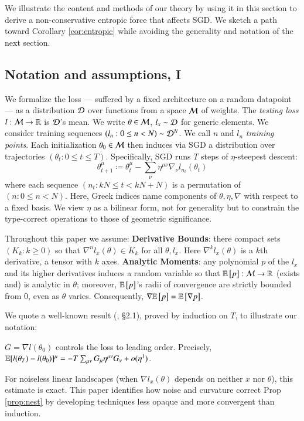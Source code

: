   We illustrate the content and methods of our theory by using it in this
  section to derive a non-conservative entropic force that affects SGD.
  We sketch a path toward Corollary \ref{cor:entropic} while avoiding the
  generality and notation of the next section.%

\subsection{Notation and assumptions, I}\label{sect:setup}

  We formalize the loss --- suffered by a fixed architecture on a random
datapoint --- as a distribution $\mathcal{D}$ over functions from a space $\mathcal{M}$ of
weights.  The \emph{testing loss} $l:\mathcal{M}\to\mathbb{R}$ is $\mathcal{D}$'s mean.  We write
$\theta\in\mathcal{M}$, $l_x\sim\mathcal{D}$ for generic elements.
%
We consider training sequences $(l_n: 0\leq n<N) \sim \mathcal{D}^N$.  We call
$n$ and $l_n$ \emph{training points}.
%
Each initialization $\theta_0 \in \mathcal{M}$ then induces via SGD a
distribution over trajectories $(\theta_t: 0\leq t \leq T)$.  Specifically,
SGD runs $T$ steps of $\eta$-steepest descent:
  \begin{equation*}
    \textstyle
    \theta_{t+1}^\mu
    \coloneqq
    \theta_t^\mu -
    \sum_{\nu}
    \eta^{\mu\nu} \nabla_\nu l_{n_t}(\theta_t)
  \end{equation*}
where each sequence $(n_t: kN\leq t<kN+N)$ is a permutation of $(n:
0\leq n<N)$.  Here, Greek indices name components of
$\theta,\eta,\nabla$ with respect to a fixed basis.  We view $\eta$
as a bilinear form, not for generality but to constrain the type-correct
operations to those of geometric significance.
%

Throughout this paper we assume:
%
\textbf{Derivative Bounds}:
there compact sets $(K_k: k\geq 0)$ so that
$\nabla^n l_x(\theta)\in K_k$ for all $\theta,l_x$. 
Here $\nabla^k
l_x(\theta)$ is a $k$th derivative, a tensor with $k$ axes.
%
\textbf{Analytic Moments}:
any polynomial $p$ of the $l_x$ and its higher derivatives
induces a random variable so that
$\mathbb{E}\left[p\right]:\mathcal{M}\to\mathbb{R}$ (exists and) is analytic in $\theta$;
moreover, $\mathbb{E}\left[p\right]$'s radii of convergence are strictly bounded from $0$,
even as $\theta$ varies.
%
Consequently, $\nabla \mathbb{E}\left[p\right]=\mathbb{E}\left[\nabla p\right]$.

We quote a well-known result
(\cite{ne04}, \S 2.1), proved by induction on $T$, to illustrate our notation:
\begin{prop}\label{prop:nest}
    $G = \nabla l(\theta_0)$ controls the loss to leading order.
    Precisely,
    $
        \mathbb{E}[l(\theta_T)-l(\theta_0)]^\mu =
        - 
        T \sum_{\mu\nu} G_\mu \eta^{\mu\nu} G_\nu
        + o(\eta^1)
    $.
\end{prop}
For noiseless linear landscapes (when $\nabla l_x(\theta)$
depends on neither $x$ nor $\theta$), this estimate is exact.
%
This paper identifies how noise and curvature correct Prop
\ref{prop:nest} by developing 
techniques less
opaque and more convergent than induction.
%

